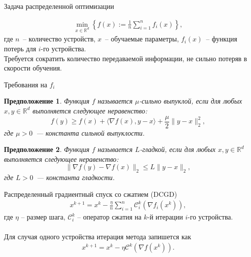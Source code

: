 \documentclass{beamer}
\newtheorem{myassumption}{Предположение}
\begin{document}
\begin{frame}{Задача распределенной оптимизации}

    \begin{align*}
     \min_{x \in \mathbb{R}^d}\left\{f(x) := \frac{1}{n}\sum\limits_{i = 1}^n f_i(x) \right\},
    \end{align*}
    где $n$~-- количество устройств, $x$~-- обучаемые параметры, $f_i(x)$~-- функция потерь для $i$-го устройства.\\
    Требуется сократить количество передаваемой информации, не сильно потеряв в скорости обучения.

\end{frame}

\begin{frame}{Требования на $f_i$}
    \begin{myassumption}
        Функция $f$ называется $\mu$-сильно выпуклой, если для любых $x, y \in \mathbb{R}^d$ выполняется следующее неравенство:
        \begin{equation}
            f(y) \geq f(x) + \langle \nabla f(x), y - x \rangle + \frac{\mu}{2} \|y - x\|_2^2, \label{eq:strong_convexity}
        \end{equation}
        где $\mu > 0$~--- константа сильной выпуклости.
    \end{myassumption}

    \begin{myassumption}
        Функция $f$ называется $L$-гладкой, если для любых $x, y \in \mathbb{R}^d$ выполняется следующее неравенство:
        \begin{equation}
            \|\nabla f(y) - \nabla f(x)\|_2 \leq L \|y - x\|_2, \label{eq:smoothness}
        \end{equation}
        где $L > 0$~--- константа гладкости.
    \end{myassumption}
\end{frame}


\begin{frame}{Распределенный градиентный спуск со сжатием (DCGD)}
    \begin{align*}
     x^{k + 1} = x^k - \frac{\eta}{n} \sum\limits_{i = 1}^n\mathcal{C}_i^k(\nabla f_i(x^k)),
    \end{align*}
    где $\eta$ -- размер шага, $\mathcal{C}_i^k$ -- оператор сжатия на $k$-й итерации $i$-го устройства.\\

    $ $\\
    Для случая одного устройства итерация метода запишется как
    \begin{align*}
     x^{k + 1} = x^k - \eta\mathcal{C}^k(\nabla f(x^k)).
    \end{align*}
\end{frame}
\end{document}
